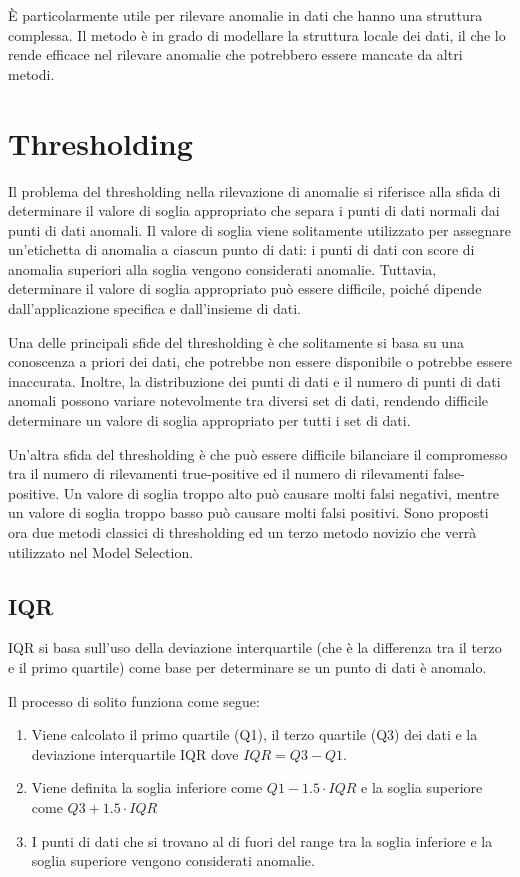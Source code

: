  È particolarmente utile per rilevare anomalie in dati che hanno una struttura complessa. Il metodo è in grado di modellare la struttura locale dei dati, il che lo rende efficace nel rilevare anomalie che potrebbero essere mancate da altri metodi.




\section{Thresholding}
Il problema del thresholding nella rilevazione di anomalie si riferisce alla sfida di determinare il valore di soglia appropriato che separa i punti di dati normali dai punti di dati anomali. Il valore di soglia viene solitamente utilizzato per assegnare un'etichetta di anomalia a ciascun punto di dati: i punti di dati con score di anomalia superiori alla soglia vengono considerati anomalie. Tuttavia, determinare il valore di soglia appropriato può essere difficile, poiché dipende dall'applicazione specifica e dall'insieme di dati.

Una delle principali sfide del thresholding è che solitamente si basa su una conoscenza a priori dei dati, che potrebbe non essere disponibile o potrebbe essere inaccurata. Inoltre, la distribuzione dei punti di dati e il numero di punti di dati anomali possono variare notevolmente tra diversi set di dati, rendendo difficile determinare un valore di soglia appropriato per tutti i set di dati.

Un'altra sfida del thresholding è che può essere difficile bilanciare il compromesso tra il numero di rilevamenti true-positive ed il numero di rilevamenti false-positive. Un valore di soglia troppo alto può causare molti falsi negativi, mentre un valore di soglia troppo basso può causare molti falsi positivi.
Sono proposti ora due metodi classici di thresholding ed un terzo metodo novizio che verrà utilizzato nel Model Selection.

\subsection{IQR}
IQR \cite{https://doi.org/10.48550/arxiv.1509.02473} si basa sull'uso della deviazione interquartile (che è la differenza tra il terzo e il primo quartile) come base per determinare se un punto di dati è anomalo.

Il processo di solito funziona come segue:
\begin{enumerate}
\item Viene calcolato il primo quartile (Q1), il terzo quartile (Q3) dei dati e la deviazione interquartile IQR dove $IQR = Q3-Q1$.
\item Viene definita la soglia inferiore come $Q1 - 1.5 \cdot IQR$ e la soglia superiore come $Q3 + 1.5 \cdot IQR$
\item I punti di dati che si trovano al di fuori del range tra la soglia inferiore e la soglia superiore vengono considerati anomalie.
\end{enumerate}

